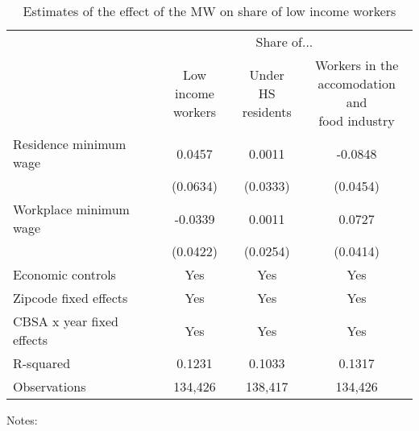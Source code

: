 \begin{table}[hbt!] \centering
    \caption{Estimates of the effect of the MW on share of low income workers}
    \label{tab:share_migration}
    \begin{tabular}{lccc}
        \toprule 
        & \multicolumn{3}{c}{Share of...} \\ \cmidrule(lr){2-4}
                & \shortstack{Low income\\workers} & \shortstack{Under HS\\residents} & \shortstack{Workers in the\\accomodation and\\food industry} \\  \midrule
        Residence minimum wage & 0.0457 & 0.0011 & -0.0848 \\
                               & (0.0634) & (0.0333) & (0.0454) \\
        Workplace minimum wage & -0.0339 & 0.0011 & 0.0727 \\
                               & (0.0422) & (0.0254) & (0.0414) \\  \midrule
        Economic controls                  &  Yes   &  Yes   &  Yes   \\
        Zipcode fixed effects              &  Yes   &  Yes   &  Yes   \\
        CBSA x year fixed effects          &  Yes   &  Yes   &  Yes   \\
        R-squared                          &  0.1231   &  0.1033   &  0.1317   \\
        Observations                       &  134,426  &  138,417  &  134,426   
        \\\bottomrule
    \end{tabular}

    
    \begin{minipage}{.95\textwidth} \footnotesize
        \vspace{2mm}
        Notes:
    \end{minipage}
\end{table}
